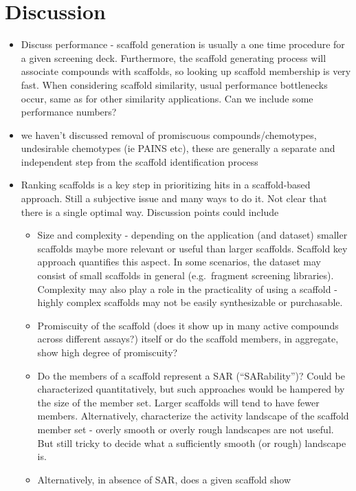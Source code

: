 \documentclass[journal=jacsat,manuscript=article]{achemso}
\newcommand*\eg{e.g.~}
\begin{document}
\section{Discussion}
\label{sec:discussion}

\begin{itemize}
\item Discuss performance - scaffold generation is usually a one time procedure
  for a given screening deck. Furthermore, the scaffold generating process will
  associate compounds with scaffolds, so looking up scaffold membership is very
  fast. When considering scaffold similarity, usual performance bottlenecks
  occur, same as for other similarity applications. Can we include some
  performance numbers?
\item we haven't discussed removal of promiscuous compounds/chemotypes,
  undesirable chemotypes (ie PAINS etc), these are generally a separate and
  independent step from the scaffold identification process
\item Ranking scaffolds is a key step in prioritizing hits in a scaffold-based
  approach. Still a subjective issue and many ways to do it. Not clear that
  there is a single optimal way. Discussion points could include
  \begin{itemize}
  \item Size and complexity - depending on the application (and
    dataset) smaller scaffolds maybe more relevant or useful than
    larger scaffolds. Scaffold key approach \cite{Ertl:2014eu}
    quantifies this aspect. In some scenarios, the dataset may consist
    of small scaffolds in general (\eg fragment screening
    libraries). Complexity may also play a role in the practicality of
    using a scaffold - highly complex scaffolds may not be easily
    synthesizable or purchasable.
  \item Promiscuity of the scaffold (does it show up in many active
    compounds across different assays?) itself or do the scaffold
    members, in aggregate, show high degree of promiscuity?
  \item Do the members of a scaffold represent a SAR (``SARability'')?
    Could be characterized quantitatively, but such approaches would
    be hampered by the size of the member set. Larger scaffolds will
    tend to have fewer members.  Alternatively, characterize the
    activity landscape of the scaffold member set - overly smooth or
    overly rough landscapes are not useful. But still tricky to decide
    what a sufficiently smooth (or rough) landscape is.
  \item Alternatively, in absence of SAR, does a given scaffold show

\end{itemize}
\end{itemize}
\end{document}
